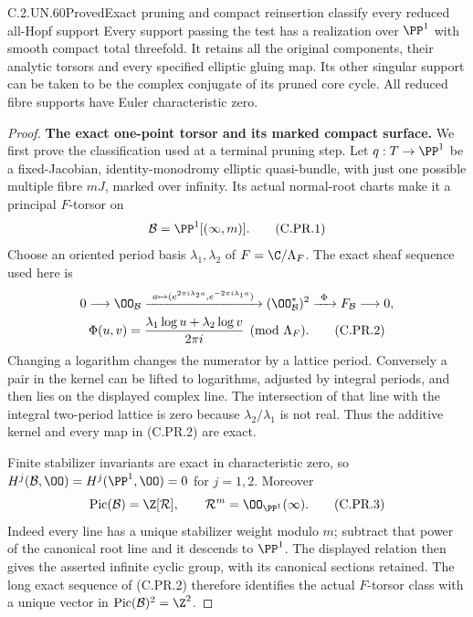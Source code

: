 \begin{statement}{C.2.UN.60}{Proved}{Exact pruning and compact reinsertion classify every reduced all-Hopf support}
Every support passing the test has a realization over $\PP^1$
with smooth compact total threefold. It retains all the original
components, their analytic torsors and every specified elliptic
gluing map. Its other singular support can be taken to be the
complex conjugate of its pruned core cycle. All reduced fibre
supports have Euler characteristic zero.
\end{statement}

\begin{proof}
\par\medskip\noindent\textbf{The exact one-point torsor and its marked compact surface.}
We first prove the classification used at a terminal pruning step.
Let $q:T\to\PP^1$ be a fixed-Jacobian, identity-monodromy elliptic
quasi-bundle, with just one possible multiple fibre $mJ$, marked
over infinity. Its actual normal-root charts make it a principal
$F$-torsor on
\[
                 \mathcal B=\PP^1[(\infty,m)].          \tag{C.PR.1}
\]
Choose an oriented period basis $\lambda_1,\lambda_2$ of
$F=\C/\Lambda_F$. The exact sheaf sequence used here is
\[
 \begin{gathered}
 0\longrightarrow\OO_{\mathcal B}
 \xrightarrow{\ a\mapsto
 (e^{2\pi i\lambda_2a},e^{-2\pi i\lambda_1a})\ }
 (\OO_{\mathcal B}^{*})^2
 \xrightarrow{\ \Phi\ }F_{\mathcal B}\longrightarrow0,\\
 \Phi(u,v)=
 \frac{\lambda_1\log u+\lambda_2\log v}{2\pi i}
                          \pmod{\Lambda_F}.            \tag{C.PR.2}
 \end{gathered}
\]
Changing a logarithm changes the numerator by a lattice period.
Conversely a pair in the kernel can be lifted to logarithms,
adjusted by integral periods, and then lies on the displayed
complex line. The intersection of that line with the integral
two-period lattice is zero because
$\lambda_2/\lambda_1$ is not real. Thus the additive kernel and
every map in (C.PR.2) are exact.

Finite stabilizer invariants are exact in characteristic zero, so
$H^j(\mathcal B,\OO)=H^j(\PP^1,\OO)=0$ for $j=1,2$.
Moreover
\[
 \operatorname{Pic}(\mathcal B)=\Z[\mathcal R],
                 \qquad \mathcal R^m=\OO_{\PP^1}(\infty).
                                                        \tag{C.PR.3}
\]
Indeed every line has a unique stabilizer weight modulo $m$;
subtract that power of the canonical root line and it descends
to $\PP^1$. The displayed relation then gives the asserted
infinite cyclic group, with its canonical sections retained.
The long exact sequence of (C.PR.2) therefore identifies the
actual $F$-torsor class with a unique vector in
$\operatorname{Pic}(\mathcal B)^2=\Z^2$.


\end{proof}
